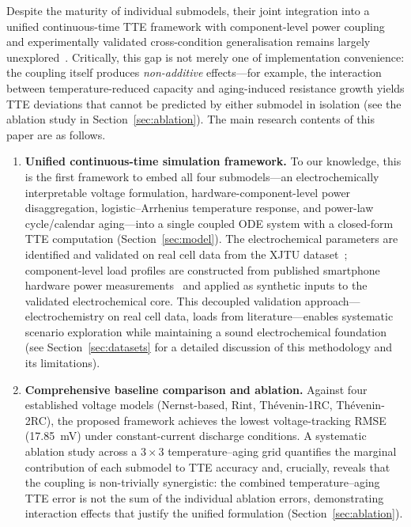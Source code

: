 \documentclass[5p,times,number]{elsarticle}
\newcommand{\secref}[1]{\textcolor{supercolor}{Section~\ref{#1}}}
\begin{document}
Despite the maturity of individual submodels, their joint integration into a unified continuous-time TTE framework with component-level power coupling and experimentally validated cross-condition generalisation remains largely unexplored~\cite{Tian2019,Xiong2018,Mama2025}.
Critically, this gap is not merely one of implementation convenience: the coupling itself produces \emph{non-additive} effects---for example, the interaction between temperature-reduced capacity and aging-induced resistance growth yields TTE deviations that cannot be predicted by either submodel in isolation (see the ablation study in \secref{sec:ablation}).
The main research contents of this paper are as follows.
\begin{enumerate}\renewcommand{\labelenumi}{(\arabic{enumi})}
    \item \textbf{Unified continuous-time simulation framework.}
    To our knowledge, this is the first framework to embed all four submodels---an electrochemically interpretable voltage formulation, hardware-component-level power disaggregation, logistic--Arrhenius temperature response, and power-law cycle/calendar aging---into a single coupled ODE system with a closed-form TTE computation (\secref{sec:model}).
    The electrochemical parameters are identified and validated on real cell data from the XJTU dataset~\cite{XJTU2020}; component-level load profiles are constructed from published smartphone hardware power measurements~\cite{Carroll2010,Chen2014,Lu2008} and applied as synthetic inputs to the validated electrochemical core.
    This decoupled validation approach---electrochemistry on real cell data, loads from literature---enables systematic scenario exploration while maintaining a sound electrochemical foundation (see \secref{sec:datasets} for a detailed discussion of this methodology and its limitations).
    \item \textbf{Comprehensive baseline comparison and ablation.}
    Against four established voltage models (Nernst-based, Rint, Th\'{e}venin-1RC, Th\'{e}venin-2RC), the proposed framework achieves the lowest voltage-tracking RMSE (\SI{17.85}{\milli\volt}) under constant-current discharge conditions.
    A systematic ablation study across a $3\times3$ temperature--aging grid quantifies the marginal contribution of each submodel to TTE accuracy and, crucially, reveals that the coupling is non-trivially synergistic: the combined temperature--aging TTE error is not the sum of the individual ablation errors, demonstrating interaction effects that justify the unified formulation (\secref{sec:ablation}).

\end{enumerate}
\end{document}
